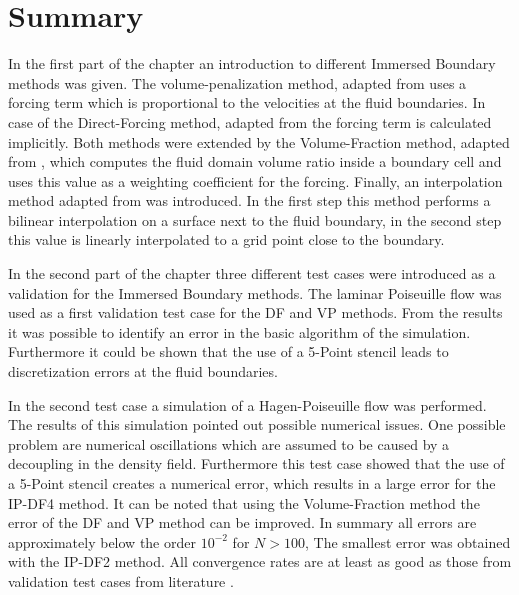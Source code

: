 
\clearpage

\section{Summary}

In the first part of the chapter an introduction to different Immersed Boundary methods was given.
The volume-penalization method, adapted from  \citep{Lulff2011} uses a forcing term which is proportional to the velocities at the fluid boundaries.
In case of the Direct-Forcing method, adapted from \citep{Fadlun2000} the forcing term is calculated implicitly.
Both methods were extended by the Volume-Fraction method, adapted from \citep{Fadlun2000}, which computes the fluid domain volume ratio inside a boundary
cell and uses this value as a weighting coefficient for the forcing.
Finally, an interpolation method adapted from  \citep{ Gilmanov2003} was introduced. In the first step this method performs a bilinear interpolation on a surface
next to the fluid boundary, in the second step this value is linearly interpolated to a grid point close to the boundary.

In the second part of the chapter three different test cases were introduced as a validation for the Immersed Boundary methods.
The laminar Poiseuille flow was used as a first validation test case for the DF and VP methods.
From the results it was possible to identify an error in the basic algorithm of the simulation.
Furthermore it could be shown that the use of a 5-Point stencil leads to discretization errors at the fluid boundaries.

In the second test case a simulation of a Hagen-Poiseuille flow was performed.
The results of this simulation pointed out possible numerical issues.
One possible problem are numerical oscillations which are assumed to be caused
by a decoupling in the density field.
Furthermore this test case showed that the use of a 5-Point stencil creates a numerical error,
which results in a large error for the IP-DF4 method.
It can be noted that using the Volume-Fraction method  the error of the DF and VP method can be improved.
In summary all errors are approximately below the order  $10^{-2}$ for $N>100$,
The smallest error was obtained with the IP-DF2 method.
All convergence rates are at least as good as those from validation test cases from literature \citep{Gilmanov2003, Gilmanov2005, Fadlun2000}.

